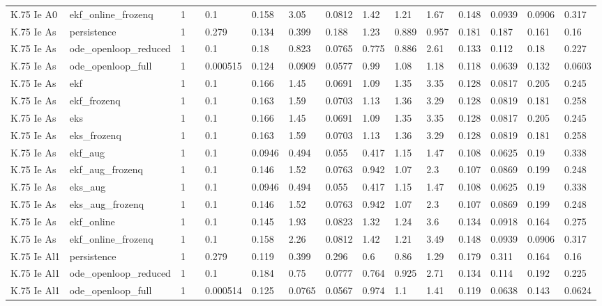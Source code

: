 \begin{table}[t]
\begin{tabular}{lllllllllllllll}
K.75 Ie A0 & ekf\_online\_frozenq & 1 &  & 0.1 & 0.158 & 3.05 & 0.0812 & 1.42 & 1.21 & 1.67 & 0.148 & 0.0939 & 0.0906 & 0.317 \\
K.75 Ie As & persistence & 1 &  & 0.279 & 0.134 & 0.399 & 0.188 & 1.23 & 0.889 & 0.957 & 0.181 & 0.187 & 0.161 & 0.16 \\
K.75 Ie As & ode\_openloop\_reduced & 1 &  & 0.1 & 0.18 & 0.823 & 0.0765 & 0.775 & 0.886 & 2.61 & 0.133 & 0.112 & 0.18 & 0.227 \\
K.75 Ie As & ode\_openloop\_full & 1 &  & 0.000515 & 0.124 & 0.0909 & 0.0577 & 0.99 & 1.08 & 1.18 & 0.118 & 0.0639 & 0.132 & 0.0603 \\
K.75 Ie As & ekf & 1 &  & 0.1 & 0.166 & 1.45 & 0.0691 & 1.09 & 1.35 & 3.35 & 0.128 & 0.0817 & 0.205 & 0.245 \\
K.75 Ie As & ekf\_frozenq & 1 &  & 0.1 & 0.163 & 1.59 & 0.0703 & 1.13 & 1.36 & 3.29 & 0.128 & 0.0819 & 0.181 & 0.258 \\
K.75 Ie As & eks & 1 &  & 0.1 & 0.166 & 1.45 & 0.0691 & 1.09 & 1.35 & 3.35 & 0.128 & 0.0817 & 0.205 & 0.245 \\
K.75 Ie As & eks\_frozenq & 1 &  & 0.1 & 0.163 & 1.59 & 0.0703 & 1.13 & 1.36 & 3.29 & 0.128 & 0.0819 & 0.181 & 0.258 \\
K.75 Ie As & ekf\_aug & 1 &  & 0.1 & 0.0946 & 0.494 & 0.055 & 0.417 & 1.15 & 1.47 & 0.108 & 0.0625 & 0.19 & 0.338 \\
K.75 Ie As & ekf\_aug\_frozenq & 1 &  & 0.1 & 0.146 & 1.52 & 0.0763 & 0.942 & 1.07 & 2.3 & 0.107 & 0.0869 & 0.199 & 0.248 \\
K.75 Ie As & eks\_aug & 1 &  & 0.1 & 0.0946 & 0.494 & 0.055 & 0.417 & 1.15 & 1.47 & 0.108 & 0.0625 & 0.19 & 0.338 \\
K.75 Ie As & eks\_aug\_frozenq & 1 &  & 0.1 & 0.146 & 1.52 & 0.0763 & 0.942 & 1.07 & 2.3 & 0.107 & 0.0869 & 0.199 & 0.248 \\
K.75 Ie As & ekf\_online & 1 &  & 0.1 & 0.145 & 1.93 & 0.0823 & 1.32 & 1.24 & 3.6 & 0.134 & 0.0918 & 0.164 & 0.275 \\
K.75 Ie As & ekf\_online\_frozenq & 1 &  & 0.1 & 0.158 & 2.26 & 0.0812 & 1.42 & 1.21 & 3.49 & 0.148 & 0.0939 & 0.0906 & 0.317 \\
K.75 Ie Al1 & persistence & 1 &  & 0.279 & 0.119 & 0.399 & 0.296 & 0.6 & 0.86 & 1.29 & 0.179 & 0.311 & 0.164 & 0.16 \\
K.75 Ie Al1 & ode\_openloop\_reduced & 1 &  & 0.1 & 0.184 & 0.75 & 0.0777 & 0.764 & 0.925 & 2.71 & 0.134 & 0.114 & 0.192 & 0.225 \\
K.75 Ie Al1 & ode\_openloop\_full & 1 &  & 0.000514 & 0.125 & 0.0765 & 0.0567 & 0.974 & 1.1 & 1.41 & 0.119 & 0.0638 & 0.143 & 0.0624 \\

\end{tabular}
\end{table}
